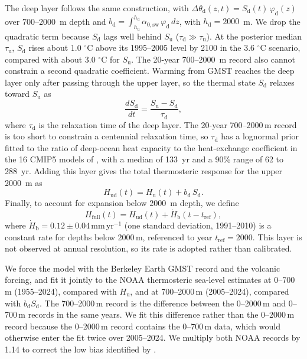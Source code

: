 \documentclass[draft,linenumbers]{agujournal2025}
\begin{document}
The deep layer follows the same construction, with $\Delta\theta_{\mathrm{d}}(z,t) = S_{\mathrm{d}}(t)\,\varphi_{\mathrm{d}}(z)$ over 700--2000~m depth and $b_{\mathrm{d}} = \int_{h_{\mathrm{u}}}^{h_{\mathrm{d}}} \alpha_{0,\mathrm{sw}}\,\varphi_{\mathrm{d}}\,dz$, with $h_{\mathrm{d}} = 2000$~m. We drop the quadratic term because $S_{\mathrm{d}}$ lags well behind $S_{\mathrm{u}}$ ($\tau_{\mathrm{d}} \gg \tau_{\mathrm{u}}$). At the posterior median $\tau_{\mathrm{u}}$, $S_{\mathrm{d}}$ rises about 1.0 $^\circ$C above its 1995--2005 level by 2100 in the 3.6 $^\circ$C scenario, compared with about 3.0 $^\circ$C for $S_{\mathrm{u}}$. The 20-year 700--2000~m record also cannot constrain a second quadratic coefficient. Warming from GMST reaches the deep layer only after passing through the upper layer, so the thermal state $S_{\mathrm{d}}$ relaxes toward $S_{\mathrm{u}}$ as
      \begin{equation}
      \frac{dS_{\mathrm{d}}}{dt} = \frac{S_{\mathrm{u}} - S_{\mathrm{d}}}{\tau_{\mathrm{d}}},
      \label{eq:thermo_sd}
      \end{equation}
where $\tau_{\mathrm{d}}$ is the relaxation time of the deep layer. The 20-year 700--2000\,m record is too short to constrain a centennial relaxation time, so $\tau_{\mathrm{d}}$ has a lognormal prior fitted to the ratio of deep-ocean heat capacity to the heat-exchange coefficient in the 16 CMIP5 models of \citet[][Table 4]{Geoffroy2013}, with a median of 133~yr and a 90\% range of 62 to 288~yr. Adding this layer gives the total thermosteric response for the upper 2000~m as
      \begin{equation}
      H_{\mathrm{ud}}(t) = H_{\mathrm{u}}(t) + b_{\mathrm{d}}\,S_{\mathrm{d}}.
      \label{eq:thermo_total}
      \end{equation}
Finally, to account for expansion below 2000~m depth, we define 
	\begin{equation}
	H_{\mathrm{full}}(t) = H_{\mathrm{ud}}(t) + \dot{H}_{\mathrm{b}}(t - t_{\mathrm{ref}}),
	\label{eq:thermo_full}
	\end{equation}
where $\dot{H}_{\mathrm{b}} = 0.12 \pm 0.04$\,mm\,yr$^{-1}$ (one standard deviation, 1991--2010) \citep{Desbruyeres2016} is a constant rate for depths below 2000\,m, referenced to year $t_{\mathrm{ref}} = 2000$. This layer is not observed at annual resolution, so its rate is adopted rather than calibrated.

We force the model with the Berkeley Earth GMST record \citep{Rohde2020} and the volcanic forcing, and fit it jointly to the NOAA thermosteric sea-level estimates \citep{Levitus2012} at 0--700\,m (1955--2024), compared with $H_{\mathrm{u}}$, and at 700--2000\,m (2005--2024), compared with $b_{\mathrm{d}}S_{\mathrm{d}}$. The 700--2000\,m record is the difference between the 0--2000\,m and 0--700\,m records in the same years. We fit this difference rather than the 0--2000\,m record because the 0--2000\,m record contains the 0--700\,m data, which would otherwise enter the fit twice over 2005--2024. We multiply both NOAA records by 1.14 to correct the low bias identified by \citet{Li2022}.
\end{document}

